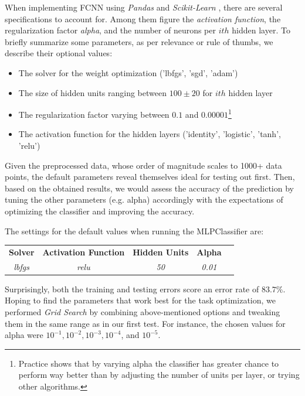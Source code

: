 When implementing FCNN using \emph{Pandas} \cite{pandasdataframe} and \emph{Scikit-Learn} \cite{scikitlearn}, there are several specifications to account for. Among them figure the
\emph{activation function}, the regularization factor \emph{alpha}, and the number of neurons per $ith$ hidden layer. To briefly
summarize some parameters, as per relevance or rule of thumbs, we describe their optional values:
\begin{itemize}
    \item The solver for the weight optimization ('lbfgs', 'sgd', 'adam')
    \item The size of hidden units ranging between $100 \pm 20$ for $ith$ hidden layer
    \item The regularization factor varying between $0.1$ and $0.00001$\footnote{Practice shows that
    by varying alpha the classifier has greater chance to perform way better than by adjusting the
    number of units per layer, or trying other algorithms.}
    \item The activation function for the hidden layers ('identity', 'logistic', 'tanh', 'relu')
\end{itemize}

Given the preprocessed data, whose order of magnitude scales to 1000+ data points, the default parameters
reveal themselves ideal for testing out first. Then, based on the obtained results, we would assess the accuracy of
the prediction by tuning the other parameters (e.g. alpha) accordingly with the expectations of optimizing
the classifier and improving the accuracy.

The settings for the default values when running the MLPClassifier are: %
\begin{center}
    \begin{tabular}{ c c c c c }
    \textbf{Solver} & \textbf{Activation Function} & \textbf{Hidden Units}  &  \textbf{Alpha} \\
    \textit{lbfgs} & \textit{relu} & \textit{50} & \textit{0.01} \\
    \end{tabular}
\end{center}
Surprisingly, both the training and testing errors score an error rate of $83.7\%$. Hoping
to find the parameters that work best for the task optimization, we performed \emph{Grid Search} by combining
above-mentioned options and tweaking them in the same range as in our first test. For instance, the chosen
values for alpha were $10^{-1}, 10^{-2}, 10^{-3}, 10^{-4}$, and $10^{-5}$.

